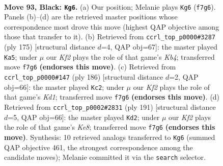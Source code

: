\documentclass[11pt]{article}
\begin{document}
\begin{figure}[p]\centering
\begin{subfigure}{0.46\textwidth}\centering
\resizebox{\linewidth}{!}{%
\newchessgame
\chessboard[
  setfen={8/1R3k2/8/8/8/7K/5p2/3r4 b - - 1 93},
  showmover=false,
  pgfstyle=straightmove, color=movearrow, markmove={f7-g6}
]}
\caption{}
\end{subfigure}\hfill
\begin{subfigure}{0.46\textwidth}\centering
\resizebox{\linewidth}{!}{%
\newchessgame
\chessboard[
  setfen={8/8/3r4/1k6/8/4p1K1/4P3/1R6 b - - 19 88},
  showmover=false,
  pgfstyle=straightmove, color=movearrow, markmove={b5-a5}
]}
\caption{}
\end{subfigure}
\\[4pt]
\begin{subfigure}{0.46\textwidth}\centering
\resizebox{\linewidth}{!}{%
\newchessgame
\chessboard[
  setfen={1k6/8/8/8/8/2R5/8/3K3r w - - 18 94},
  showmover=false,
  pgfstyle=straightmove, color=movearrow, markmove={d1-c2}
]}
\caption{}
\end{subfigure}\hfill
\begin{subfigure}{0.46\textwidth}\centering
\resizebox{\linewidth}{!}{%
\newchessgame
\chessboard[
  setfen={8/7r/8/8/4p3/4P3/6K1/R3k3 b - - 13 96},
  showmover=false,
  pgfstyle=straightmove, color=movearrow, markmove={e1-d2}
]}
\caption{}
\end{subfigure}
\caption{\textbf{Move 93, Black: \texttt{Kg6}.} (a) Our position; Melanie plays \texttt{Kg6} (\texttt{f7g6}). Panels (b)--(d) are the retrieved master positions whose correspondence most drove this move (highest QAP objective among those that transfer to it). (b) Retrieved from \texttt{ccrl\_top\_p0000\#3287} (ply 175) [structural distance $d$=4, QAP obj=67]: the master played \texttt{Ka5}; under $\mu$ our \emph{Kf2} plays the role of that game's \emph{Kb4}; transferred move \texttt{f7g6} \textbf{(endorses this move)}. (c) Retrieved from \texttt{ccrl\_top\_p0000\#147} (ply 186) [structural distance $d$=2, QAP obj=66]: the master played \texttt{Kc2}; under $\mu$ our \emph{Kf2} plays the role of that game's \emph{Kd1}; transferred move \texttt{f7g6} \textbf{(endorses this move)}. (d) Retrieved from \texttt{ccrl\_top\_p0002\#2831} (ply 191) [structural distance $d$=5, QAP obj=66]: the master played \texttt{Kd2}; under $\mu$ our \emph{Kf2} plays the role of that game's \emph{Ke8}; transferred move \texttt{f7g6} \textbf{(endorses this move)}. Synthesis: 10 retrieved analogs transferred to \texttt{Kg6} (summed QAP objective 461, the strongest correspondence among the candidate moves); Melanie committed it via the \texttt{search} selector.}
\label{fig:thought-m185}
\end{figure}
\end{document}
